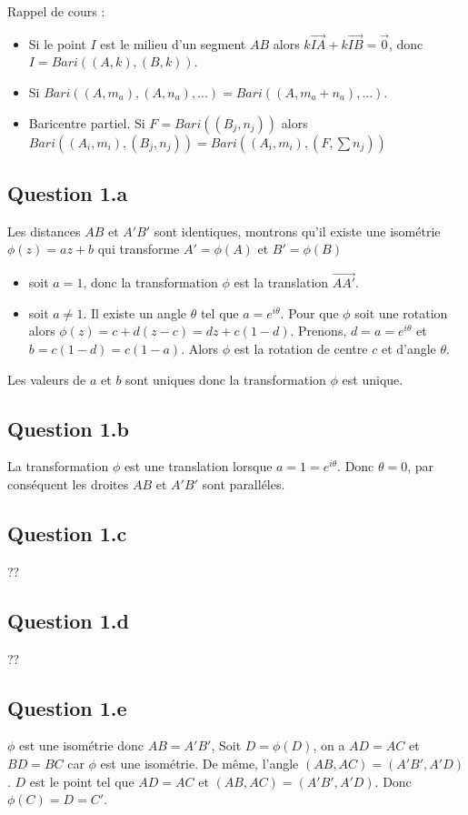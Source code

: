 \documentclass[]{book}
\theoremstyle{definition}
\begin{document}
Rappel de cours :
\begin{itemize}
\item Si le point $I$ est le milieu d'un segment $AB$ alors $k\overrightarrow{IA}+k\overrightarrow{IB} = \overrightarrow{0}$, donc $I=Bari((A,k),(B,k))$.
\item Si $Bari((A,m_a), (A,n_a), ...) = Bari((A,m_a+n_a), ...)$.
\item Baricentre partiel. Si $F = Bari((B_j, n_j))$ alors $Bari((A_i,m_i),(B_j, n_j)) = Bari((A_i,m_i),(F,\sum n_j))$
\end{itemize}


\subsection*{Question 1.a}
Les distances $AB$ et $A'B'$ sont identiques, montrons qu'il existe une isom\'etrie $\phi(z) =  az+ b$ qui transforme $A' = \phi(A)$ et $B' = \phi(B)$ 
\begin{itemize}
\item soit $a=1$, donc la transformation $\phi$ est la translation $\overrightarrow{AA'}$.
\item soit $a \neq 1$. Il existe un angle $\theta$ tel que $a=e^{i\theta}$. Pour que $\phi$ soit une rotation alors $\phi(z) =  c + d(z - c) = dz +c(1-d)$. Prenons, $d = a = e^{i\theta}$ et $b=c(1-d)=c(1-a)$. Alors $\phi$ est la rotation de centre $c$ et d'angle $\theta$. 
\end{itemize}

Les valeurs de $a$ et $b$ sont uniques donc la transformation $\phi$ est unique.

\subsection*{Question 1.b}
La transformation $\phi$ est une translation lorsque $a=1=e^{i\theta}$. Donc $\theta = 0$, par cons\'equent les droites $AB$ et $A'B'$ sont parall\'eles. 

\subsection*{Question 1.c}
??


\subsection*{Question 1.d}
??

\subsection*{Question 1.e}
$\phi$ est une isom\'etrie donc $AB = A'B'$, Soit $D = \phi(D)$, on a $AD = AC$ et $BD = BC$ car $\phi$ est une isom\'etrie.
De m\^eme, l'angle $(AB, AC) = (A'B', A'D)$. $D$ est le point tel que $AD=AC$ et  $(AB, AC) = (A'B', A'D)$. Donc $\phi(C)=D=C'$.
\end{document}
